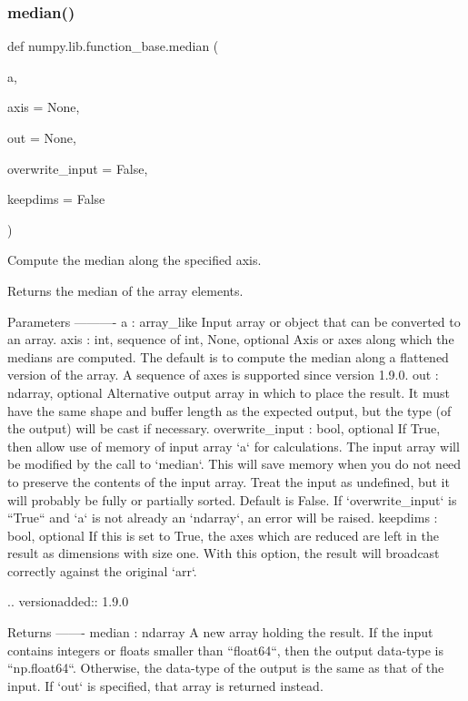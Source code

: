 \subsubsection{\texorpdfstring{median()}{median()}}
{\footnotesize\ttfamily def numpy.\+lib.\+function\+\_\+base.\+median (\begin{DoxyParamCaption}\item[{}]{a,  }\item[{}]{axis = {\ttfamily None},  }\item[{}]{out = {\ttfamily None},  }\item[{}]{overwrite\+\_\+input = {\ttfamily False},  }\item[{}]{keepdims = {\ttfamily False} }\end{DoxyParamCaption})}

\begin{DoxyVerb}Compute the median along the specified axis.

Returns the median of the array elements.

Parameters
----------
a : array_like
    Input array or object that can be converted to an array.
axis : {int, sequence of int, None}, optional
    Axis or axes along which the medians are computed. The default
    is to compute the median along a flattened version of the array.
    A sequence of axes is supported since version 1.9.0.
out : ndarray, optional
    Alternative output array in which to place the result. It must
    have the same shape and buffer length as the expected output,
    but the type (of the output) will be cast if necessary.
overwrite_input : bool, optional
   If True, then allow use of memory of input array `a` for
   calculations. The input array will be modified by the call to
   `median`. This will save memory when you do not need to preserve
   the contents of the input array. Treat the input as undefined,
   but it will probably be fully or partially sorted. Default is
   False. If `overwrite_input` is ``True`` and `a` is not already an
   `ndarray`, an error will be raised.
keepdims : bool, optional
    If this is set to True, the axes which are reduced are left
    in the result as dimensions with size one. With this option,
    the result will broadcast correctly against the original `arr`.

    .. versionadded:: 1.9.0

Returns
-------
median : ndarray
    A new array holding the result. If the input contains integers
    or floats smaller than ``float64``, then the output data-type is
    ``np.float64``.  Otherwise, the data-type of the output is the
    same as that of the input. If `out` is specified, that array is
    returned instead.


\end{DoxyVerb}
